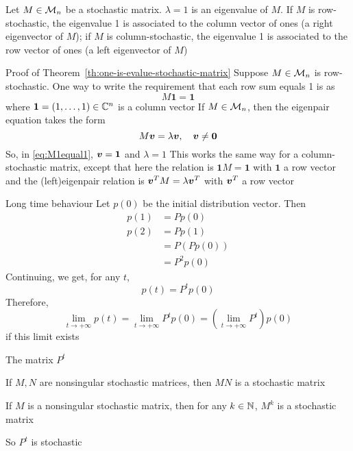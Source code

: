 \documentclass[aspectratio=169]{beamer}\usepackage[]{graphicx}\usepackage[]{xcolor}
\begin{document}
\begin{frame}
\begin{importanttheorem}
\label{th:one-is-evalue-stochastic-matrix}
Let $M\in\mathcal{M}_n$ be a stochastic matrix. $\lambda =1$ is an eigenvalue of $M$. 
If $M$ is row-stochastic, the eigenvalue 1 is associated to the column vector of ones (a right eigenvector of $M$); if $M$ is column-stochastic, the eigenvalue 1 is associated to the row vector of ones (a left eigenvector of $M$)
\end{importanttheorem}
\end{frame}

\begin{frame}[red]{Proof of Theorem~\ref{th:one-is-evalue-stochastic-matrix}}
Suppose $M\in\mathcal{M}_n$ is row-stochastic. One way to write the requirement that each row sum equals 1 is as 
\begin{equation}\label{eq:M1equal1}
M\mathbf{1}=\mathbf{1}
\end{equation}
where $\mathbf{1}=(1,\ldots,1)\in\mathbb{C}^n$ is a column vector
\vfill
If $M\in\mathcal{M}_n$, then the eigenpair equation takes the form
\[
M\bv=\lambda\bv,\quad \bv\neq\b0
\]
So, in \eqref{eq:M1equal1}, $\bm{v}=\mathbf{1}$ and $\lambda=1$
\vfill
This works the same way for a column-stochastic matrix, except that here the relation is $\mathbf{1}M=\mathbf{1}$ with $\mathbf{1}$ a row vector and the (left)eigenpair relation is $\bm{v}^TM=\lambda\bm{v}^T$ with $\bm{v}^T$ a row vector
\end{frame}

\begin{frame}{Long time behaviour}
Let $p(0)$ be the initial distribution vector. Then
\begin{align*}
p(1) &= Pp(0) \\
p(2) &= Pp(1) \\
&= P\left(Pp(0)\right) \\
&= P^2p(0)
\end{align*}
\vfill
Continuing, we get, for any $t$,
\[
p(t)=P^tp(0)
\]
\vfill
Therefore, 
\[
\lim_{t\rightarrow +\infty}p(t) =
\lim_{t\rightarrow +\infty}P^tp(0) =
\left(\lim_{t\rightarrow +\infty}P^t\right)
p(0)
\]
if this limit exists
\end{frame}


\begin{frame}{The matrix $P^t$}
\begin{theorem}
If $M,N$ are nonsingular stochastic matrices, then $MN$ is a stochastic matrix
\end{theorem}
\vfill
\begin{corollary}
If $M$ is a nonsingular stochastic matrix, then for any $k\in\mathbb{N}$, $M^k$ is a stochastic matrix
\end{corollary}
\vfill
So $P^t$ is stochastic
\end{frame}
\end{document}

